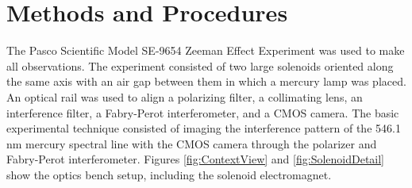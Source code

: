 \documentclass[twocolumn]{article}
\begin{document}
		
\section{Methods and Procedures}
	The Pasco Scientific Model SE-9654 Zeeman Effect Experiment was used to make all observations.
	The experiment consisted of two large solenoids oriented along the same axis with an air gap between them in which a mercury lamp was placed.
	An optical rail was used to align a polarizing filter, a collimating lens, an interference filter, a Fabry-Perot interferometer, and a CMOS camera.
	The basic experimental technique consisted of imaging the interference pattern of the 546.1 nm mercury spectral line with the CMOS camera through the polarizer and Fabry-Perot interferometer.
	Figures \ref{fig:ContextView} and \ref{fig:SolenoidDetail} show the optics bench setup, including the solenoid electromagnet.
	
\end{document}
